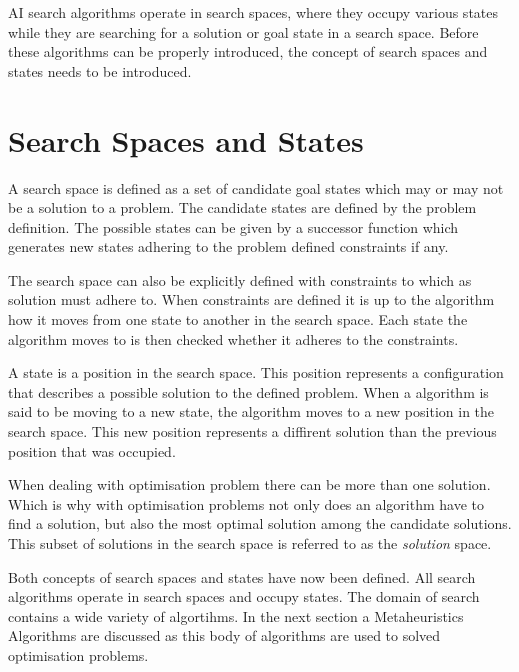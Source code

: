 \gls{AI} search algorithms operate in search spaces, where they occupy various states while they are searching for a solution or goal state in a search space. Before these algorithms can be properly introduced, the concept of search spaces and states needs to be introduced.

\section{Search Spaces and States}
A search space is defined as a set of candidate goal states which may or may not be a solution to a problem\cite{AIModernApproach}. The candidate states are defined by the problem definition\cite{AIModernApproach}. The possible states can be given by a successor function which generates new states adhering to the problem defined constraints if any\cite{AIModernApproach}. 

The search space can also be explicitly defined with constraints to which as solution must adhere to\cite{AIModernApproach}. When constraints are defined it is up to the algorithm how it moves from one state to another in the search space\cite{AIModernApproach}. Each state the algorithm moves to is then checked whether it adheres to the constraints\cite{AIModernApproach}.

A state is a position in the search space\cite{AIModernApproach}. This position represents a configuration that describes a possible solution to the defined problem\cite{AIModernApproach}. When a algorithm is said to be moving to a new state, the algorithm moves to a new position in the search space\cite{AIModernApproach}. This new position represents a diffirent solution than the previous position that was occupied\cite{AIModernApproach}.

When dealing with optimisation problem there can be more than one solution\cite{AIModernApproach}. Which is why with optimisation problems not only does an algorithm have to find a solution, but also the most optimal solution among the candidate solutions\cite{AIModernApproach}. This subset of solutions in the search space is referred to as the \emph{solution} space.

Both concepts of search spaces and states have now been defined. All search algorithms operate in search spaces and occupy states. The domain of search contains a wide variety of algortihms. In the next section a Metaheuristics Algorithms are discussed as this body of algorithms are used to solved optimisation problems.

